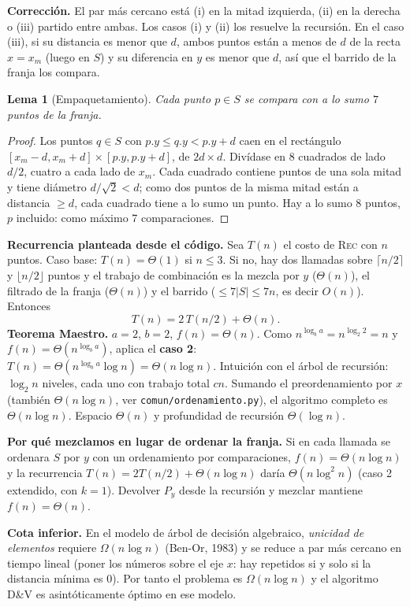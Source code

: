 \documentclass[11pt,letterpaper]{article}
\theoremstyle{plain}
\newtheorem{lema}{Lema}
\theoremstyle{definition}
\newcommand{\Th}{\Theta}
\newcommand{\Om}{\Omega}
\newcommand{\cajah}[1]{\par\smallskip\colorbox{fondo}{\parbox{\dimexpr\linewidth-2\fboxsep}{\small #1}}\par\smallskip}
\begin{document}
\textbf{Corrección.} El par más cercano está (i) en la mitad izquierda, (ii) en la derecha o
(iii) partido entre ambas. Los casos (i) y (ii) los resuelve la recursión. En el caso (iii), si su
distancia es menor que $d$, ambos puntos están a menos de $d$ de la recta $x=x_m$ (luego en $S$) y su
diferencia en $y$ es menor que $d$, así que el barrido de la franja los compara.

\begin{lema}[Empaquetamiento]\label{lem:siete}
Cada punto $p\in S$ se compara con a lo sumo $7$ puntos de la franja.
\end{lema}
\begin{proof}
Los puntos $q\in S$ con $p.y \le q.y < p.y+d$ caen en el rectángulo $[x_m-d,x_m+d]\times[p.y,p.y+d]$,
de $2d\times d$. Divídase en 8 cuadrados de lado $d/2$, cuatro a cada lado de $x_m$. Cada cuadrado
contiene puntos de una sola mitad y tiene diámetro $d/\sqrt2<d$; como dos puntos de la misma mitad
están a distancia $\ge d$, cada cuadrado tiene a lo sumo un punto. Hay a lo sumo 8 puntos, $p$
incluido: como máximo 7 comparaciones.
\end{proof}

\textbf{Recurrencia planteada desde el código.} Sea $T(n)$ el costo de \textsc{Rec} con $n$ puntos.
Caso base: $T(n)=\Th(1)$ si $n\le3$. Si no, hay dos llamadas sobre $\lceil n/2\rceil$ y
$\lfloor n/2\rfloor$ puntos y el trabajo de combinación es la mezcla por $y$ ($\Th(n)$), el filtrado de
la franja ($\Th(n)$) y el barrido ($\le 7|S|\le 7n$, es decir $O(n)$). Entonces
\[
  T(n) = 2\,T(n/2) + \Th(n).
\]
\textbf{Teorema Maestro.} $a=2$, $b=2$, $f(n)=\Th(n)$. Como $n^{\log_b a}=n^{\log_2 2}=n$ y
$f(n)=\Th(n^{\log_b a})$, aplica el \textbf{caso 2}: $T(n)=\Th(n^{\log_b a}\log n)=\Th(n\log n)$.
Intuición con el árbol de recursión: $\log_2 n$ niveles, cada uno con trabajo total $cn$.
Sumando el preordenamiento por $x$ (también $\Th(n\log n)$, ver \texttt{comun/ordenamiento.py}),
el algoritmo completo es $\Th(n\log n)$. Espacio $\Th(n)$ y profundidad de recursión $\Th(\log n)$.

\cajah{\textbf{Por qué mezclamos en lugar de ordenar la franja.} Si en cada llamada se ordenara $S$ por
$y$ con un ordenamiento por comparaciones, $f(n)=\Th(n\log n)$ y la recurrencia
$T(n)=2T(n/2)+\Th(n\log n)$ daría $\Th(n\log^2 n)$ (caso 2 extendido, con $k=1$). Devolver $P_y$ desde
la recursión y mezclar mantiene $f(n)=\Th(n)$.}

\textbf{Cota inferior.} En el modelo de árbol de decisión algebraico, \emph{unicidad de elementos}
requiere $\Om(n\log n)$ (Ben-Or, 1983) y se reduce a par más cercano en tiempo lineal (poner los números
sobre el eje $x$: hay repetidos si y solo si la distancia mínima es $0$). Por tanto el problema es
$\Om(n\log n)$ y el algoritmo D\&V es asintóticamente óptimo en ese modelo.
\end{document}
